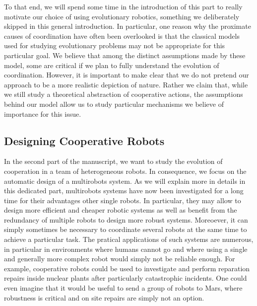 
    To that end, we will spend some time in the introduction of this part to really motivate our choice of using evolutionary robotics, something we deliberately skipped in this general introduction. In particular, one reason why the proximate causes of coordination have often been overlooked is that the classical models used for studying evolutionary problems may not be appropriate for this particular goal. We believe that among the distinct assumptions made by these model, some are critical if we plan to fully understand the evolution of coordination. However, it is important to make clear that we do not pretend our approach to be a more realistic depiction of nature. Rather we claim that, while we still study a theoretical abstraction of cooperative actions, the assumptions behind our model allow us to study particular mechanisms we believe of importance for this issue.


  \subsection{Designing Cooperative Robots}

    In the second part of the manuscript, we want to study the evolution of cooperation in a team of heterogeneous robots. In consequence, we focus on the automatic design of a multirobots system. As we will explain more in details in this dedicated part, multirobots systems have now been investigated for a long time for their advantages other single robots. In particular, they may allow to design more efficient and cheaper robotic systems as well as benefit from the redundancy of multiple robots to design more robust systems. Moreoever, it can simply sometimes be necessary to coordinate several robots at the same time to achieve a particular task. The pratical applications of such systems are numerous, in particular in environments where humans cannot go and where using a single and generally more complex robot would simply not be reliable enough. For example, cooperative robots could be used to investigate and perform reparation repairs inside nuclear plants after particularly catastrophic incidents. One could even imagine that it would be useful to send a group of robots to Mars, where robustness is critical and on site repairs are simply not an option.


